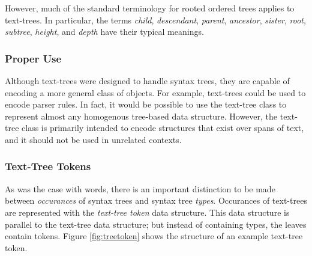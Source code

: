\documentclass[11pt]{article}
\begin{document}
  However, much of the standard terminology for rooted ordered trees
  applies to text-trees.  In particular, the terms \emph{child},
  \emph{descendant}, \emph{parent}, \emph{ancestor}, \emph{sister},
  \emph{root}, \emph{subtree}, \emph{height}, and \emph{depth} have
  their typical meanings.

%
%
%
%

\subsubsection{Proper Use}
  Although text-trees were designed to handle syntax trees, they are
  capable of encoding a more general class of objects.  For example,
  text-trees could be used to encode parser rules.  In fact, it would
  be possible to use the text-tree class to represent almost any
  homogenous tree-based data structure.  However, the text-tree class
  is primarily intended to encode structures that exist over spans of
  text, and it should not be used in unrelated contexts.

\subsubsection{Text-Tree Tokens}
  As was the case with words, there is an important distinction to be
  made between \emph{occurances} of syntax trees and syntax tree
  \emph{types}.  Occurances of text-trees are represented with the
  \emph{text-tree token} data structure.  This data structure is
  parallel to the text-tree data structure; but instead of containing
  types, the leaves contain tokens.  Figure \ref{fig:treetoken} shows
  the structure of an example text-tree token.
\end{document}
